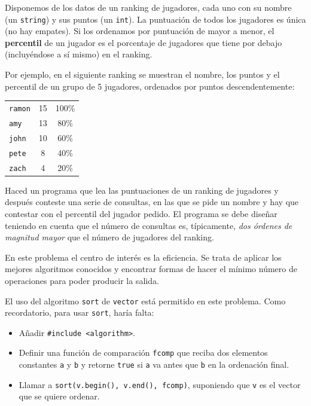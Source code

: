
\Statement

Disponemos de los datos de un ranking de jugadores, cada uno con su nombre (un \verb|string|) y sus puntos (un \verb|int|). La puntuación de todos los jugadores es única (no hay empates). Si los ordenamos por puntuación de mayor a menor, el \textbf{percentil} de un jugador es el porcentaje de jugadores que tiene por debajo (incluyéndose a sí mismo) en el ranking.

\medskip

Por ejemplo, en el siguiente ranking se muestran el nombre, los puntos y el percentil de un grupo de 5 jugadores, ordenados por puntos descendentemente:

\medskip

\begin{tabular}{lcc}
    \verb|ramon| & 15 & 100\% \\
    \verb|amy| & 13 & 80\% \\
    \verb|john| & 10 & 60\% \\
    \verb|pete| & 8 & 40\% \\
    \verb|zach| & 4 & 20\% \\
\end{tabular}

\medskip

Haced un programa que lea las puntuaciones de un ranking de jugadores y después conteste una serie de consultas, en las que se pide un nombre y hay que contestar con el percentil del jugador pedido. El programa se debe diseñar teniendo en cuenta que el número de consultas es, típicamente, \emph{dos órdenes de magnitud mayor} que el número de jugadores del ranking.

\Observation

En este problema el centro de interés es la eficiencia. Se trata de aplicar los mejores algoritmos conocidos y encontrar formas de hacer el mínimo número de operaciones para poder producir la salida.

\medskip

El uso del algoritmo \verb|sort| de \verb|vector| está permitido en este problema. Como recordatorio, para usar \verb|sort|, haría falta:
\begin{itemize}
\item Añadir \verb|#include <algorithm>|.
\item Definir una función de comparación \verb|fcomp| que reciba dos elementos constantes \verb|a| y \verb|b| y retorne \verb|true| si \verb|a| va antes que \verb|b| en la ordenación final.
\item Llamar a \verb|sort(v.begin(), v.end(), fcomp)|, suponiendo que \verb|v| es el vector que se quiere ordenar.
\end{itemize}


